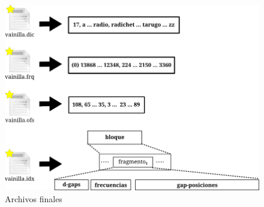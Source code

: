 \begin{figure}[!ht]
\centering
    \includegraphics[scale=0.8]{./Images/indice2_2.png}
\caption{Archivos finales}
\label{fig:indice2_2}
\end{figure}






